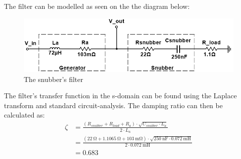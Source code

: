The filter can be modelled as seen on the the diagram below:
\begin{figure}[H]
	\centering
	\includegraphics[width=0.9\linewidth]{Hardware/LoadSystem/SnubberFilter}
	\caption{The snubber's filter}
	\label{fig:SnubberFilter}
\end{figure}

The filter's transfer function in the s-domain can be found using the Laplace transform and standard circuit-analysis. The damping ratio can then be calculated as:
\begin{equation}
	\begin{split}
		\zeta &= \frac{(R_{snubber} + R_{load} + R_a) \cdot \sqrt{C_{snubber} \cdot  L_a}}{2 \cdot L_a}\\
		&= \frac{(\SI{22}{\ohm} + \SI{1.1065}{\ohm} + \SI{103}{\milli \ohm}) \cdot \sqrt{\SI{250}{\nano \farad} \cdot \SI{0.072}{\milli \henry}}}{2 \cdot \SI{0.072}{\milli \henry}}\\
		&= 0.683
	\end{split}
\end{equation}